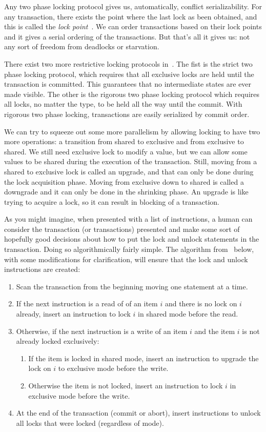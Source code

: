 Any two phase locking protocol gives us, automatically, conflict serializability. For any transaction, there exists the point where the last lock as been obtained, and this is called the \textit{lock point}~\cite{dsc}. We can order transactions based on their lock points and it gives a serial ordering of the transactions. But that's all it gives us: not any sort of freedom from deadlocks or starvation.

There exist two more restrictive locking protocols in~\cite{dsc}. The fist is the strict two phase locking protocol, which requires that all exclusive locks are held until the transaction is committed. This guarantees that no intermediate states are ever made visible. The other is the rigorous two phase locking protocol which requires all locks, no matter the type, to be held all the way until the commit. With rigorous two phase locking, transactions are easily serialized by commit order.

We can try to squeeze out some more parallelism by allowing locking to have two more operations: a transition from shared to exclusive and from exclusive to shared. We still need exclusive lock to modify a value, but we can allow some values to be shared during the execution of the transaction. Still, moving from a shared to exclusive lock is called an upgrade, and that can only be done during the lock acquisition phase. Moving from exclusive down to shared is called a downgrade and it can only be done in the shrinking phase. An upgrade is like trying to acquire a lock, so it can result in blocking of a transaction.

As you might imagine, when presented with a list of instructions, a human can consider the transaction (or transactions) presented and make some sort of hopefully good decisions about how to put the lock and unlock statements in the transaction. Doing so algorithmically fairly simple. The algorithm from~\cite{dsc} below, with some modifications for clarification, will ensure that the lock and unlock instructions are created:

\begin{enumerate}
	\item Scan the transaction from the beginning moving one statement at a time.
	\item If the next instruction is a read of of an item $i$ and there is no lock on $i$ already, insert an instruction to lock $i$ in shared mode before the read.
	\item Otherwise, if the next instruction is a write of an item $i$ and the item $i$ is not already locked exclusively:
		\begin{enumerate}
			\item If the item is locked in shared mode, insert an instruction to upgrade the lock on $i$ to exclusive mode before the write.
			\item Otherwise the item is not locked, insert an instruction to lock $i$ in exclusive mode before the write.
		\end{enumerate}
	\item At the end of the transaction (commit or abort), insert instructions to unlock all locks that were locked (regardless of mode).
\end{enumerate}

